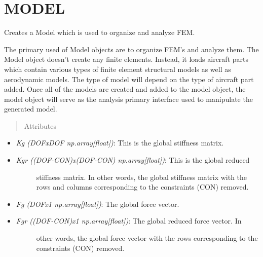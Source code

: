 \documentclass[letterpaper,10pt,english]{sphinxmanual}
\begin{document}
\section{MODEL}
\label{FEM:model}

\begin{fulllineitems}
\label{FEM:AeroComBAT.FEM.Model}
Creates a Model which is used to organize and analyze FEM.

The primary used of Model objects are to organize FEM's and analyze them.
The Model object doesn't create any finite elements. Instead, it loads
aircraft parts which contain various types of finite element structural
models as well as aerodynamic models. The type of model will depend on the
type of aircraft part added. Once all of the models are created and added
to the model object, the model object will serve as the analysis primary
interface used to manipulate the generated model.
\begin{quote}\begin{description}
\item[{Attributes}] \leavevmode
\end{description}\end{quote}
\begin{itemize}
\item {} 
\emph{Kg (DOFxDOF np.array{[}float{]})}: This is the global stiffness matrix.

\item {} \begin{description}
\item[{\emph{Kgr ((DOF-CON)x(DOF-CON) np.array{[}float{]})}: This is the global reduced}] \leavevmode
stiffness matrix. In other words, the global stiffness matrix with the
rows and columns corresponding to the constraints (CON) removed.

\end{description}

\item {} 
\emph{Fg (DOFx1 np.array{[}float{]})}: The global force vector.

\item {} \begin{description}
\item[{\emph{Fgr ((DOF-CON)x1 np.array{[}float{]})}: The global reduced force vector. In}] \leavevmode
other words, the global force vector with the rows corresponding to the
constraints (CON) removed.


\end{description}
\end{itemize}
\end{fulllineitems}
\end{document}
